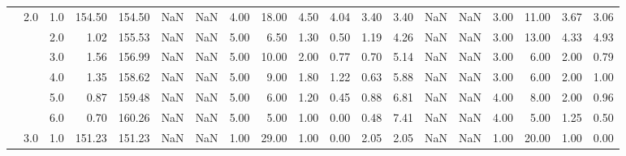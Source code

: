 \begin{tabular}{lllrrrrrrrrrrrrrrrr}
       & 2.0 & 1.0  &    154.50 &     154.50 &               NaN &                NaN &  4.00 &  18.00 &             4.50 &                         4.04 &      3.40 &       3.40 &               NaN &                NaN &  3.00 &  11.00 &             3.67 &                         3.06 \\
       &     & 2.0  &      1.02 &     155.53 &               NaN &                NaN &  5.00 &   6.50 &             1.30 &                         0.50 &      1.19 &       4.26 &               NaN &                NaN &  3.00 &  13.00 &             4.33 &                         4.93 \\
       &     & 3.0  &      1.56 &     156.99 &               NaN &                NaN &  5.00 &  10.00 &             2.00 &                         0.77 &      0.70 &       5.14 &               NaN &                NaN &  3.00 &   6.00 &             2.00 &                         0.79 \\
       &     & 4.0  &      1.35 &     158.62 &               NaN &                NaN &  5.00 &   9.00 &             1.80 &                         1.22 &      0.63 &       5.88 &               NaN &                NaN &  3.00 &   6.00 &             2.00 &                         1.00 \\
       &     & 5.0  &      0.87 &     159.48 &               NaN &                NaN &  5.00 &   6.00 &             1.20 &                         0.45 &      0.88 &       6.81 &               NaN &                NaN &  4.00 &   8.00 &             2.00 &                         0.96 \\
       &     & 6.0  &      0.70 &     160.26 &               NaN &                NaN &  5.00 &   5.00 &             1.00 &                         0.00 &      0.48 &       7.41 &               NaN &                NaN &  4.00 &   5.00 &             1.25 &                         0.50 \\
       & 3.0 & 1.0  &    151.23 &     151.23 &               NaN &                NaN &  1.00 &  29.00 &             1.00 &                         0.00 &      2.05 &       2.05 &               NaN &                NaN &  1.00 &  20.00 &             1.00 &                         0.00 \\
\bottomrule
\end{tabular}
